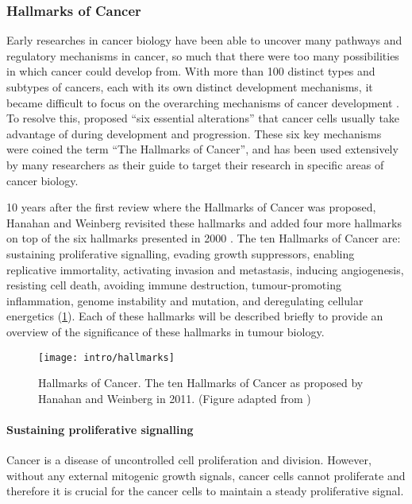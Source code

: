 \subsubsection{Hallmarks of Cancer}
\label{subsubsec:cancerhallmarks}

Early researches in cancer biology have been able to uncover many pathways and regulatory mechanisms in cancer, so much that there were too many possibilities in which cancer could develop from.
With more than 100 distinct types and subtypes of cancers, each with its own distinct development mechanisms, it became difficult to focus on the overarching mechanisms of cancer development \citep{Hanahan2000}.
To resolve this, \citet{Hanahan2000} proposed ``six essential alterations'' that cancer cells usually take advantage of during development and progression.
These six key mechanisms were coined the term ``The Hallmarks of Cancer'', and has been used extensively by many researchers as their guide to target their research in specific areas of cancer biology.

10 years after the first review where the Hallmarks of Cancer was proposed, Hanahan and Weinberg revisited these hallmarks and added four more hallmarks on top of the six hallmarks presented in 2000 \citep{Hanahan2011}.
The ten Hallmarks of Cancer are: sustaining proliferative signalling, evading growth suppressors, enabling replicative immortality, activating invasion and metastasis, inducing angiogenesis, resisting cell death, avoiding immune destruction, tumour-promoting inflammation, genome instability and mutation, and deregulating cellular energetics (\cref{fig:hallmarks}).
Each of these hallmarks will be described briefly to provide an overview of the significance of these hallmarks in tumour biology.

\begin{figure}[h!]
	\centering
	\texttt{[image: intro/hallmarks]}
	\caption[Hallmarks of Cancer]{Hallmarks of Cancer. The ten Hallmarks of Cancer as proposed by Hanahan and Weinberg in 2011. (Figure adapted from \citet{Hanahan2011})}
	\label{fig:hallmarks}
\end{figure}

\paragraph{Sustaining proliferative signalling}

\noindent
Cancer is a disease of uncontrolled cell proliferation and division.
However, without any external mitogenic growth signals, cancer cells cannot proliferate and therefore it is crucial for the cancer cells to maintain a steady proliferative signal.

